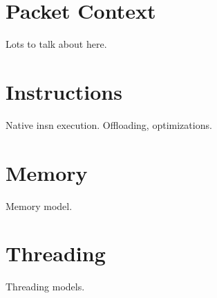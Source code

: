 \section{Packet Context}
\label{vm:context}
Lots to talk about here.

\section{Instructions}
\label{vm:insn}
Native insn execution. Offloading, optimizations.

\section{Memory}
\label{vm:memory}
Memory model.

\section{Threading}
\label{vm:threading}
Threading models.
